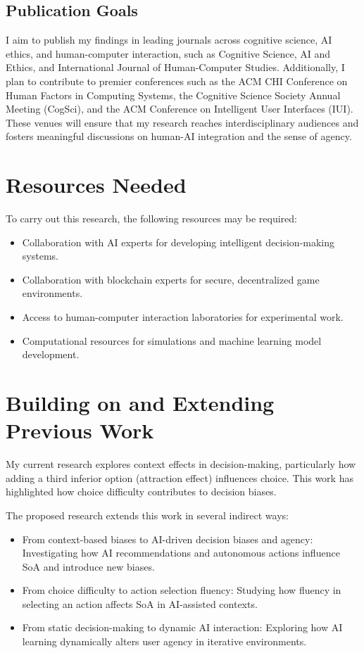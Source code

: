 \documentclass[12pt]{article}
\begin{document}
\subsection{Publication Goals}

I aim to publish my findings in leading journals across cognitive science, AI ethics, and human-computer interaction, such as Cognitive Science, AI and Ethics, and International Journal of Human-Computer Studies. Additionally, I plan to contribute to premier conferences such as the ACM CHI Conference on Human Factors in Computing Systems, the Cognitive Science Society Annual Meeting (CogSci), and the ACM Conference on Intelligent User Interfaces (IUI). These venues will ensure that my research reaches interdisciplinary audiences and fosters meaningful discussions on human-AI integration and the sense of agency.

\section{Resources Needed}

To carry out this research, the following resources may be required:

\begin{itemize}
    \item Collaboration with AI experts for developing intelligent decision-making systems.
    \item Collaboration with blockchain experts for secure, decentralized game environments.
    \item Access to human-computer interaction laboratories for experimental work.
    \item Computational resources for simulations and machine learning model development.
\end{itemize}

\section{Building on and Extending Previous Work}

My current research explores context effects in decision-making, particularly how adding a third inferior option (attraction effect) influences choice. This work has highlighted how choice difficulty contributes to decision biases.

The proposed research extends this work in several indirect ways:

\begin{itemize}
    \item From context-based biases to AI-driven decision biases and agency: Investigating how AI recommendations and autonomous actions influence SoA and introduce new biases.
    \item From choice difficulty to action selection fluency: Studying how fluency in selecting an action affects SoA in AI-assisted contexts.
    \item From static decision-making to dynamic AI interaction: Exploring how AI learning dynamically alters user agency in iterative environments.
\end{itemize}
\end{document}
